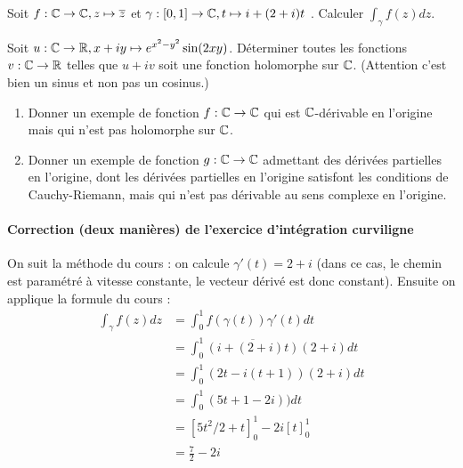 \begin{exo}
Soit  $f : \mathbb{C}\to \mathbb{C}, z\mapsto \overline{z}$ et $\gamma : [0,1] \to \mathbb{C}, t\mapsto i+(2+i)t$ .
Calculer $\int_{\gamma} f(z)dz$.
\end{exo}


\begin{exo}
Soit $u : \mathbb{C}\to \mathbb{R},  x+iy \mapsto e^{x^2-y^2}\sin(2xy)$. 
Déterminer toutes les fonctions $v : \mathbb{C}\to \mathbb{R}$ telles que $u+iv$ soit une fonction holomorphe sur $\mathbb{C}$. 
(Attention c'est bien un sinus et non pas un cosinus.)
\begin{sol}
\end{sol}
\end{exo}


\begin{exo}
\begin{enumerate}
\item  Donner un exemple de fonction $f : \mathbb{C}\to \mathbb{C}$ qui est $\mathbb{C}$-dérivable en l'origine mais qui n'est pas holomorphe sur $\mathbb{C}$.
\item Donner un exemple de fonction $g : \mathbb{C}\to \mathbb{C}$ admettant des dérivées partielles en l'origine, dont les dérivées partielles en l'origine satisfont les conditions de Cauchy-Riemann, mais qui n'est pas dérivable au sens complexe en l'origine.
\end{enumerate}
\begin{sol}
\end{sol}
\end{exo}

\newpage


\paragraph{Correction (deux manières) de l'exercice d'intégration curviligne}
On suit la méthode  du cours : on calcule $\gamma'(t) = 2+i$ (dans ce cas, le chemin est paramétré à vitesse constante, le vecteur dérivé est donc constant). Ensuite on applique la formule du cours :
\begin{align*}
\int_{\gamma} f(z)dz 
&= \int_0^1 f(\gamma(t))\gamma'(t)dt \\
&= \int_0^1 \overline{(i+(2+i)t)}(2+i)dt \\
&= \int_0^1 (2t-i(t+1))(2+i)dt \\
&= \int_0^1 (5t+1 -2i))dt \\
&= \left[5t^2/2+t\right]_0^1 -2 i\left[ t\right]_0^1 \\
&= \frac72-2i
\end{align*}



